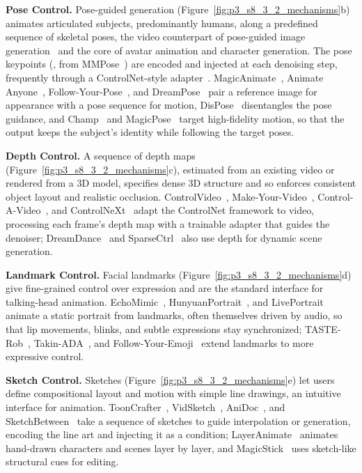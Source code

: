\noindent\textbf{Pose Control.} Pose-guided generation (Figure~\ref{fig:p3_s8_3_2_mechanisms}b) animates articulated subjects, predominantly humans, along a predefined sequence of skeletal poses, the video counterpart of pose-guided image generation~\cite{ju2023humansd,zhang2023adding,Ju_2023_CVPR} and the core of avatar animation and character generation. The pose keypoints (\eg, from MMPose~\cite{mmpose2020}) are encoded and injected at each denoising step, frequently through a ControlNet-style adapter~\cite{zhang2023adding}. MagicAnimate~\cite{xu2024magicanimate}, Animate Anyone~\cite{hu2024animate}, Follow-Your-Pose~\cite{ma2024followyourpose}, and DreamPose~\cite{karras2023dreampose} pair a reference image for appearance with a pose sequence for motion, DisPose~\cite{li2024dispose} disentangles the pose guidance, and Champ~\cite{zhu2024champ} and MagicPose~\cite{chang2023magicpose} target high-fidelity motion, so that the output keeps the subject's identity while following the target poses.

\noindent\textbf{Depth Control.} A sequence of depth maps (Figure~\ref{fig:p3_s8_3_2_mechanisms}c), estimated from an existing video or rendered from a 3D model, specifies dense 3D structure and so enforces consistent object layout and realistic occlusion. ControlVideo~\cite{zhao2025controlvideo}, Make-Your-Video~\cite{xing2024make}, Control-A-Video~\cite{chen2023control}, and ControlNeXt~\cite{peng2024controlnext} adapt the ControlNet framework to video, processing each frame's depth map with a trainable adapter that guides the denoiser; DreamDance~\cite{pang2024dreamdance} and SparseCtrl~\cite{guo2024sparsectrl} also use depth for dynamic scene generation.

\noindent\textbf{Landmark Control.} Facial landmarks (Figure~\ref{fig:p3_s8_3_2_mechanisms}d) give fine-grained control over expression and are the standard interface for talking-head animation. EchoMimic~\cite{chen2024echomimic}, HunyuanPortrait~\cite{xu2025hunyuanportrait}, and LivePortrait~\cite{guo2024liveportrait} animate a static portrait from landmarks, often themselves driven by audio, so that lip movements, blinks, and subtle expressions stay synchronized; TASTE-Rob~\cite{zhao2025taste}, Takin-ADA~\cite{lin2024takin}, and Follow-Your-Emoji~\cite{ma2024follow} extend landmarks to more expressive control.

\noindent\textbf{Sketch Control.} Sketches (Figure~\ref{fig:p3_s8_3_2_mechanisms}e) let users define compositional layout and motion with simple line drawings, an intuitive interface for animation. ToonCrafter~\cite{xing2024tooncrafter}, VidSketch~\cite{jiang2025vidsketch}, AniDoc~\cite{meng2025anidoc}, and SketchBetween~\cite{loftsdottir2022sketchbetween} take a sequence of sketches to guide interpolation or generation, encoding the line art and injecting it as a condition; LayerAnimate~\cite{yang2025layeranimate} animates hand-drawn characters and scenes layer by layer, and MagicStick~\cite{ma2025magicstick} uses sketch-like structural cues for editing.


